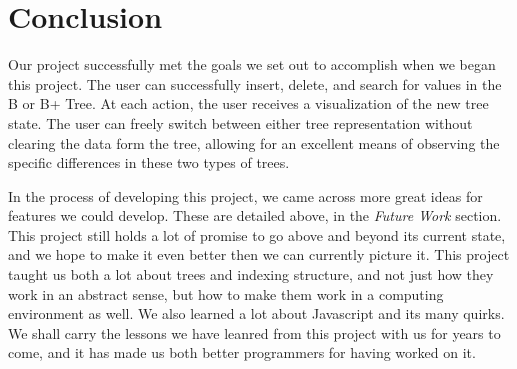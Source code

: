 \section{Conclusion}

Our project successfully met the goals we set out to accomplish when
we began this project. The user can successfully insert, delete, and
search for values in the B or B+ Tree. At each action, the user
receives a visualization of the new tree state.  The user can freely
switch between either tree representation without clearing the data
form the tree, allowing for an excellent means of observing the
specific differences in these two types of trees.

In the process of developing this project, we came across more great
ideas for features we could develop. These are detailed above, in the
\textit{Future Work} section.  This project still holds a lot of
promise to go above and beyond its current state, and we hope to make
it even better then we can currently picture it.  This project taught
us both a lot about trees and indexing structure, and not just how
they work in an abstract sense, but how to make them work in a
computing environment as well. We also learned a lot about Javascript
and its many quirks.  We shall carry the lessons we have leanred from
this project with us for years to come, and it has made us both better
programmers for having worked on it.
